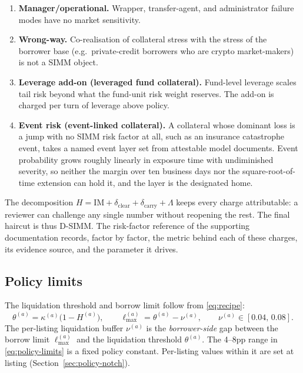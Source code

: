\begin{enumerate}[label=(\roman*)]
\item \textbf{Manager/operational.} Wrapper, transfer-agent, and administrator failure modes have no market sensitivity.
\item \textbf{Wrong-way.} Co-realisation of collateral stress with the stress of the borrower base (e.g.\ private-credit borrowers who are crypto market-makers) is not a SIMM object.
\item \textbf{Leverage add-on (leveraged fund collateral).} Fund-level leverage scales tail risk beyond what the fund-unit risk weight reserves. The add-on is charged per turn of leverage above policy.
\item \textbf{Event risk (event-linked collateral).} A collateral whose dominant loss is a jump with no SIMM risk factor at all, such as an insurance catastrophe event, takes a named event layer set from attestable model documents. Event probability grows roughly linearly in exposure time with undiminished severity, so neither the margin over ten business days nor the square-root-of-time extension can hold it, and the layer is the designated home.
\end{enumerate}
The decomposition $H = \mathrm{IM} + \delta_{\mathrm{clear}} + \delta_{\mathrm{carry}} + \Lambda$ keeps every charge attributable: a reviewer can challenge any single number without reopening the rest. The final haircut is thus D-SIMM. The risk-factor reference of the supporting documentation records, factor by factor, the metric behind each of these charges, its evidence source, and the parameter it drives.

\subsection{Policy limits}\label{sec:theory:limits}

The liquidation threshold and borrow limit follow from \eqref{eq:recipe}:
\begin{equation}\label{eq:policy-limits}
\theta^{(a)} = \kappa^{(a)}\bigl(1 - H^{(a)}\bigr),\qquad
\ell_{\max}^{(a)} = \theta^{(a)} - \nu^{(a)},\qquad \nu^{(a)}\in[0.04,\,0.08].
\end{equation}
The per-listing liquidation buffer $\nu^{(a)}$ is the \emph{borrower-side} gap between the borrow limit $\ell_{\max}^{(a)}$ and the liquidation threshold $\theta^{(a)}$. The 4--8pp range in \eqref{eq:policy-limits} is a fixed policy constant. Per-listing values within it are set at listing (Section~\ref{sec:policy-notch}).

